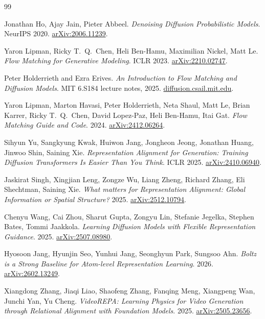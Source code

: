 \documentclass[12pt,a4paper,twoside]{report}
\begin{document}
\begin{thebibliography}{99}


Jonathan Ho, Ajay Jain, Pieter Abbeel.
\textit{Denoising Diffusion Probabilistic Models}. NeurIPS 2020.
\href{https://arxiv.org/abs/2006.11239}{arXiv:2006.11239}.

Yaron Lipman, Ricky T.~Q.~Chen, Heli Ben-Hamu, Maximilian Nickel, Matt Le.
\textit{Flow Matching for Generative Modeling}. ICLR 2023.
\href{https://arxiv.org/abs/2210.02747}{arXiv:2210.02747}.

Peter Holderrieth and Ezra Erives.
\textit{An Introduction to Flow Matching and Diffusion Models}.
MIT 6.S184 lecture notes, 2025.
\href{https://diffusion.csail.mit.edu/}{diffusion.csail.mit.edu}.

Yaron Lipman, Marton Havasi, Peter Holderrieth, Neta Shaul, Matt Le, Brian Karrer, Ricky T.~Q.~Chen, David Lopez-Paz, Heli Ben-Hamu, Itai Gat.
\textit{Flow Matching Guide and Code}. 2024.
\href{https://arxiv.org/abs/2412.06264}{arXiv:2412.06264}.


Sihyun Yu, Sangkyung Kwak, Huiwon Jang, Jongheon Jeong, Jonathan Huang, Jinwoo Shin, Saining Xie.
\textit{Representation Alignment for Generation: Training Diffusion Transformers Is Easier Than You Think}. ICLR 2025.
\href{https://arxiv.org/abs/2410.06940}{arXiv:2410.06940}.

Jaskirat Singh, Xingjian Leng, Zongze Wu, Liang Zheng, Richard Zhang, Eli Shechtman, Saining Xie.
\textit{What matters for Representation Alignment: Global Information or Spatial Structure?} 2025.
\href{https://arxiv.org/abs/2512.10794}{arXiv:2512.10794}.

Chenyu Wang, Cai Zhou, Sharut Gupta, Zongyu Lin, Stefanie Jegelka, Stephen Bates, Tommi Jaakkola.
\textit{Learning Diffusion Models with Flexible Representation Guidance}. 2025.
\href{https://arxiv.org/abs/2507.08980}{arXiv:2507.08980}.

Hyosoon Jang, Hyunjin Seo, Yunhui Jang, Seonghyun Park, Sungsoo Ahn.
\textit{Boltz is a Strong Baseline for Atom-level Representation Learning}. 2026.
\href{https://arxiv.org/abs/2602.13249}{arXiv:2602.13249}.

Xiangdong Zhang, Jiaqi Liao, Shaofeng Zhang, Fanqing Meng, Xiangpeng Wan, Junchi Yan, Yu Cheng.
\textit{VideoREPA: Learning Physics for Video Generation through Relational Alignment with Foundation Models}. 2025.
\href{https://arxiv.org/abs/2505.23656}{arXiv:2505.23656}.


\end{thebibliography}
\end{document}
